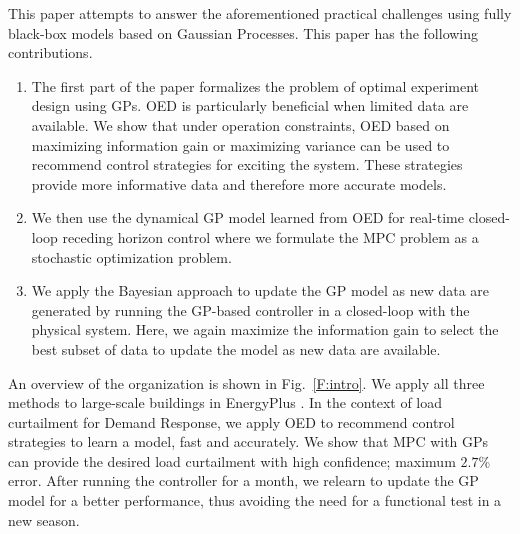
This paper attempts to answer the aforementioned practical challenges using fully black-box models based on Gaussian Processes.
This paper has the following contributions.
\begin{enumerate}
	\item The first part of the paper formalizes the problem of optimal experiment design using GPs. OED is particularly beneficial when limited data are available. We show that under operation constraints, OED based on maximizing information gain or maximizing variance can be used to recommend control strategies for exciting the system. These strategies provide more informative data and therefore more accurate models.
	\item We  then use the dynamical GP model learned from OED for real-time closed-loop receding horizon control where we formulate the MPC problem as a stochastic optimization problem.
	\item We apply the Bayesian approach to update the GP model as new data are generated by running the GP-based controller in a closed-loop with the physical system. Here, we again maximize the information gain to select the best subset of data to update the model as new data are available.
\end{enumerate}
An overview of the organization is shown in Fig.~\ref{F:intro}.
We apply all three methods to large-scale buildings in EnergyPlus \cite{Deru2011}. In the context of load curtailment for Demand Response, we apply OED to recommend control strategies to learn a model, fast and accurately. We show that MPC with GPs can provide the desired load curtailment with high confidence; maximum \(2.7\%\) error. After running the controller for a month, we relearn to update the GP model for a better performance, thus avoiding the need for a functional test in a new season.

